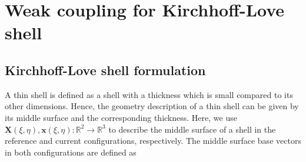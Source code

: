 \documentclass[preprint,12pt]{elsarticle}
\theoremstyle{remark}
\begin{document}
\section{Weak coupling for Kirchhoff-Love shell}
\subsection{Kirchhoff-Love shell formulation}
A thin shell is defined as a shell with a thickness which is small compared to its other dimensions. Hence, the geometry description of a thin shell can be given by its middle surface and the corresponding thickness. Here, we use $\mathbf{X}(\xi, \eta),\mathbf{x}(\xi, \eta):\mathbb{R}^2\rightarrow\mathbb{R}^3$ to describe the middle surface of a shell in the reference and current configurations, respectively. The middle surface base vectors in both configurations are defined as
\end{document}
